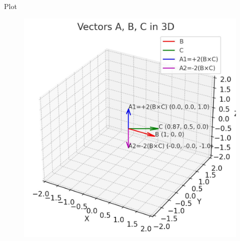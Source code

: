 \documentclass{beamer}
\begin{document}
\begin{frame}{Plot}
    \begin{figure}[H]
\centering
\includegraphics[width=0.5\columnwidth]{figs/graph.png}
\label{fig:graph.png}
\end{figure}
\end{frame}
\end{document}
